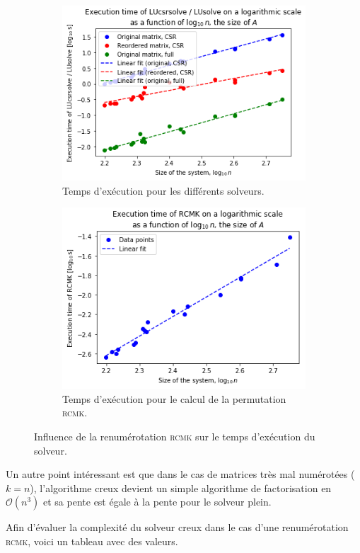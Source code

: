 \documentclass[11pt]{article}
\begin{document}
\begin{figure}[H]
	\centering
	\begin{subfigure}[t]{0.37\textwidth}
		\centering
		\includegraphics[width=\linewidth]{all_exec_time.png}
		\caption{Temps d'exécution pour les différents solveurs.}
		\label{fig:all_exec_time}
	\end{subfigure}%
	\begin{subfigure}[t]{0.37\textwidth}
		\centering
		\includegraphics[width=\linewidth]{rcmk_exec.png}
		\caption{Temps d'exécution pour le calcul de la permutation \textsc{rcmk}.}
		\label{fig:rcmk_exec}
	\end{subfigure}
	\caption{Influence de la renumérotation \textsc{rcmk} sur le temps d'exécution du solveur.}
	\label{fig:rcmk_solve}
\end{figure}
Un autre point intéressant est que dans le cas de matrices très mal numérotées ($k = n$), l'algorithme creux devient un simple algorithme de factorisation en $\mathcal{O}(n^3)$ et sa pente est égale à la pente pour le solveur plein.

Afin d'évaluer la complexité du solveur creux dans le cas d'une renumérotation \textsc{rcmk}, voici un tableau avec des valeurs.
\end{document}
